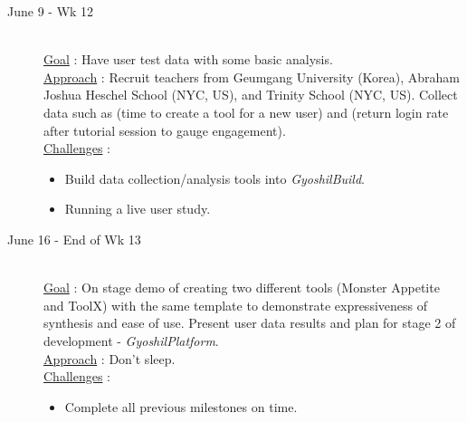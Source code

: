 \documentclass{article}
\begin{document}
\begin{description}
    \item[June 9 - Wk 12] \hfill \\
    \underline{Goal} : Have user test data with some basic analysis.\\
    \underline{Approach} : Recruit teachers from Geumgang University (Korea), Abraham Joshua Heschel School (NYC, US), and Trinity School (NYC, US). Collect data such as (time to create a tool for a new user) and (return login rate after tutorial session to gauge engagement).\\
    \underline{Challenges} :
    \begin{itemize}
        \item Build data collection/analysis tools into \textit{GyoshilBuild}.
        \item Running a live user study.
    \end{itemize}

    \item[June 16 - End of Wk 13] \hfill \\
    \underline{Goal} : On stage demo of creating two different tools (Monster Appetite and ToolX) with the same template to demonstrate expressiveness of synthesis and ease of use. Present user data results and plan for stage 2 of development - \textit{GyoshilPlatform}.\\
    \underline{Approach} : Don't sleep.\\
    \underline{Challenges} :
    \begin{itemize}
        \item Complete all previous milestones on time.
    \end{itemize}

\end{description}
\end{document}
